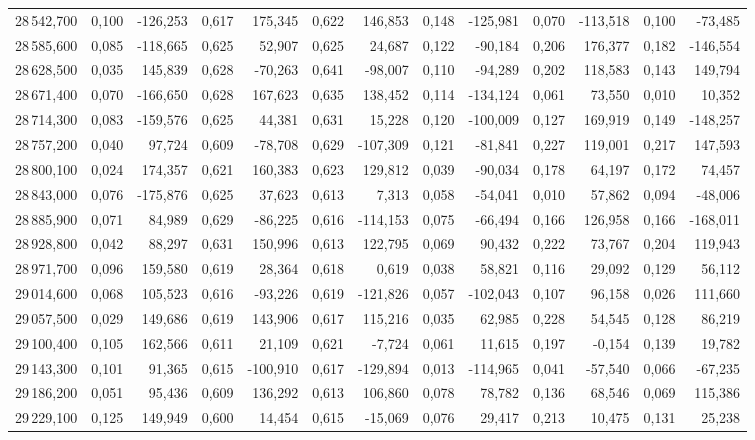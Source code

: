 \begin{longtable}{rrrrrrrrrrrrr}
28\,542,700 & 0,100 & -126,253 & 0,617 & 175,345 & 0,622 & 146,853 & 0,148 & -125,981 & 0,070 & -113,518 & 0,100 & -73,485\\
28\,585,600 & 0,085 & -118,665 & 0,625 & 52,907 & 0,625 & 24,687 & 0,122 & -90,184 & 0,206 & 176,377 & 0,182 & -146,554\\
28\,628,500 & 0,035 & 145,839 & 0,628 & -70,263 & 0,641 & -98,007 & 0,110 & -94,289 & 0,202 & 118,583 & 0,143 & 149,794\\
28\,671,400 & 0,070 & -166,650 & 0,628 & 167,623 & 0,635 & 138,452 & 0,114 & -134,124 & 0,061 & 73,550 & 0,010 & 10,352\\
28\,714,300 & 0,083 & -159,576 & 0,625 & 44,381 & 0,631 & 15,228 & 0,120 & -100,009 & 0,127 & 169,919 & 0,149 & -148,257\\
28\,757,200 & 0,040 & 97,724 & 0,609 & -78,708 & 0,629 & -107,309 & 0,121 & -81,841 & 0,227 & 119,001 & 0,217 & 147,593\\
28\,800,100 & 0,024 & 174,357 & 0,621 & 160,383 & 0,623 & 129,812 & 0,039 & -90,034 & 0,178 & 64,197 & 0,172 & 74,457\\
28\,843,000 & 0,076 & -175,876 & 0,625 & 37,623 & 0,613 & 7,313 & 0,058 & -54,041 & 0,010 & 57,862 & 0,094 & -48,006\\
28\,885,900 & 0,071 & 84,989 & 0,629 & -86,225 & 0,616 & -114,153 & 0,075 & -66,494 & 0,166 & 126,958 & 0,166 & -168,011\\
28\,928,800 & 0,042 & 88,297 & 0,631 & 150,996 & 0,613 & 122,795 & 0,069 & 90,432 & 0,222 & 73,767 & 0,204 & 119,943\\
28\,971,700 & 0,096 & 159,580 & 0,619 & 28,364 & 0,618 & 0,619 & 0,038 & 58,821 & 0,116 & 29,092 & 0,129 & 56,112\\
29\,014,600 & 0,068 & 105,523 & 0,616 & -93,226 & 0,619 & -121,826 & 0,057 & -102,043 & 0,107 & 96,158 & 0,026 & 111,660\\
29\,057,500 & 0,029 & 149,686 & 0,619 & 143,906 & 0,617 & 115,216 & 0,035 & 62,985 & 0,228 & 54,545 & 0,128 & 86,219\\
29\,100,400 & 0,105 & 162,566 & 0,611 & 21,109 & 0,621 & -7,724 & 0,061 & 11,615 & 0,197 & -0,154 & 0,139 & 19,782\\
29\,143,300 & 0,101 & 91,365 & 0,615 & -100,910 & 0,617 & -129,894 & 0,013 & -114,965 & 0,041 & -57,540 & 0,066 & -67,235\\
29\,186,200 & 0,051 & 95,436 & 0,609 & 136,292 & 0,613 & 106,860 & 0,078 & 78,782 & 0,136 & 68,546 & 0,069 & 115,386\\
29\,229,100 & 0,125 & 149,949 & 0,600 & 14,454 & 0,615 & -15,069 & 0,076 & 29,417 & 0,213 & 10,475 & 0,131 & 25,238\\

\end{longtable}
